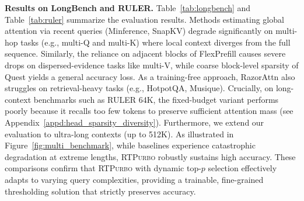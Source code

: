 \documentclass{llmxive}
\providecommand{\name}{{\textsc{RTPurbo}}\xspace}
\begin{document}
\noindent\textbf{Results on LongBench and RULER.} Table~\ref{tab:longbench} and Table~\ref{tab:ruler} summarize the evaluation results. Methods estimating global attention via recent queries (Minference, SnapKV) degrade significantly on multi-hop tasks (e.g., multi-Q and multi-K) where local context diverges from the full sequence. Similarly, the reliance on adjacent blocks of FlexPrefill causes severe drops on dispersed-evidence tasks like multi-V, while coarse block-level sparsity of Quest yields a general accuracy loss. As a training-free approach, RazorAttn also struggles on retrieval-heavy tasks (e.g., HotpotQA, Musique). Crucially, on long-context benchmarks such as RULER 64K, the fixed-budget variant performs poorly because it recalls too few tokens to preserve sufficient attention mass (see Appendix~\ref{appd:head_sparsity_diversity}). Furthermore, we extend our evaluation to ultra-long contexts (up to 512K). As illustrated in Figure~\ref{fig:multi_benchmark}, while baselines experience catastrophic degradation at extreme lengths, \name robustly sustains high accuracy. These comparisons confirm that \name with dynamic top-$p$ selection effectively adapts to varying query complexities, providing a trainable, fine-grained thresholding solution that strictly preserves accuracy. 
\end{document}
